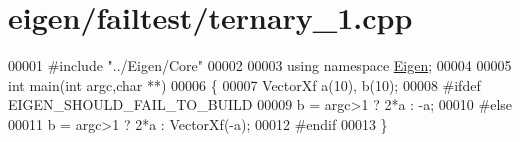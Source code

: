 \hypertarget{eigen_2failtest_2ternary__1_8cpp_source}{}\section{eigen/failtest/ternary\+\_\+1.cpp}
\label{eigen_2failtest_2ternary__1_8cpp_source}

\begin{DoxyCode}
00001 \textcolor{preprocessor}{#include "../Eigen/Core"}
00002 
00003 \textcolor{keyword}{using namespace }\hyperlink{namespace_eigen}{Eigen};
00004 
00005 \textcolor{keywordtype}{int} main(\textcolor{keywordtype}{int} argc,\textcolor{keywordtype}{char} **)
00006 \{
00007   VectorXf a(10), b(10);
00008 \textcolor{preprocessor}{#ifdef EIGEN\_SHOULD\_FAIL\_TO\_BUILD}
00009   b = argc>1 ? 2*a : -a;
00010 \textcolor{preprocessor}{#else}
00011   b = argc>1 ? 2*a : VectorXf(-a);
00012 \textcolor{preprocessor}{#endif}
00013 \}
\end{DoxyCode}
